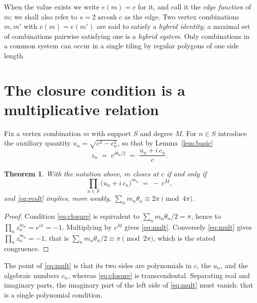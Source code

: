 \documentclass[11pt,a4paper]{article}
\theoremstyle{plain}
\newtheorem{theorem}{Theorem}[section]
\theoremstyle{definition}
\theoremstyle{remark}
\begin{document}
When the value exists we write $e(m)=c$ for it, and call it the \emph{edge
function} of $m$; we shall also refer to $s=2\operatorname{arcosh}c$ as the edge.
Two vertex combinations $m,m'$ with $e(m)=e(m')$ are said to satisfy a
\emph{hybrid identity}; a maximal set of combinations pairwise satisfying one is a
\emph{hybrid system}. Only combinations in a common system can occur in a single
tiling by regular polygons of one side length.

\section{The closure condition is a multiplicative relation}\label{sec:decide}

Fix a vertex combination $m$ with support $S$ and degree $M$. For $n\in S$
introduce the auxiliary quantity $u_n=\sqrt{c^{2}-c_n^{2}}$, so that by
Lemma~\ref{lem:basic}
\[
  z_n \;=\; e^{i\theta_n/2}\;=\;\frac{u_n+i\,c_n}{c}.
\]

\begin{theorem}\label{thm:closure}
With the notation above, $m$ closes at $c$ if and only if
\begin{equation}\label{eq:mult}
  \prod_{n\in S}\bigl(u_n+i\,c_n\bigr)^{m_n}\;=\;-\,c^{M},
\end{equation}
and \eqref{eq:mult} implies, more weakly,
$\sum_n m_n\theta_n\equiv2\pi \pmod{4\pi}$.
\end{theorem}

\begin{proof}
Condition \eqref{eq:closure} is equivalent to $\sum_n m_n\theta_n/2=\pi$, hence to
$\prod_n z_n^{m_n}=e^{i\pi}=-1$. Multiplying by $c^{M}$ gives \eqref{eq:mult}.
Conversely \eqref{eq:mult} gives $\prod_n z_n^{m_n}=-1$, that is
$\sum_n m_n\theta_n/2\equiv\pi\pmod{2\pi}$, which is the stated congruence.
\end{proof}

The point of \eqref{eq:mult} is that its two sides are polynomials in $c$, the
$u_n$, and the algebraic numbers $c_n$, whereas \eqref{eq:closure} is
transcendental. Separating real and imaginary parts, the imaginary part of the
left side of \eqref{eq:mult} must vanish; that is a single polynomial condition.
\end{document}
